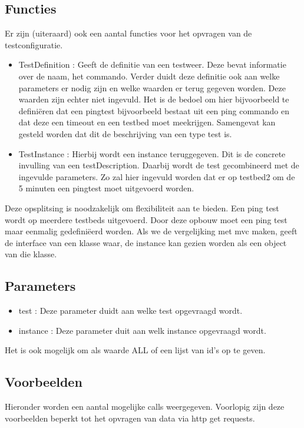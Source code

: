 \documentclass[11pt]{article}
\begin{document}
\subsection{Functies}
Er zijn (uiteraard) ook een aantal functies voor het opvragen van de testconfiguratie.
\begin{itemize}
\item TestDefinition : Geeft de definitie van een testweer. Deze bevat informatie over de naam, het commando. Verder duidt deze definitie ook aan welke parameters er nodig zijn en welke waarden er terug gegeven worden. Deze waarden zijn echter niet ingevuld. Het is de bedoel om hier bijvoorbeeld te defini\"eren dat een pingtest bijvoorbeeld bestaat uit een ping commando en dat deze een timeout en een testbed moet meekrijgen. Samengevat kan gesteld worden dat dit de beschrijving van een type test is.
\item TestInstance : Hierbij wordt een instance teruggegeven. Dit is de concrete invulling van een testDescription. Daarbij wordt de test gecombineerd met de ingevulde parameters. Zo zal hier ingevuld worden dat er op testbed2 om de 5 minuten een pingtest moet uitgevoerd worden.
\end{itemize}

Deze opsplitsing is noodzakelijk om flexibiliteit aan te bieden. 
Een ping test wordt op meerdere testbeds uitgevoerd. Door deze opbouw moet een ping test maar eenmalig gedefini\"eerd worden. Als we de vergelijking met mvc maken, geeft de interface van een klasse waar, de instance kan gezien worden als een object van die klasse.

\subsection{Parameters}

\begin{itemize}
\item test : Deze parameter duidt aan welke test opgevraagd wordt.
\item instance : Deze parameter duit aan welk instance opgevraagd wordt.
\end{itemize}
Het is ook mogelijk om als waarde ALL of een lijst van id's op te geven.

\subsection{Voorbeelden}
Hieronder worden een aantal mogelijke calls weergegeven. Voorlopig zijn deze voorbeelden beperkt tot het opvragen van data via http get requests.
\end{document}
